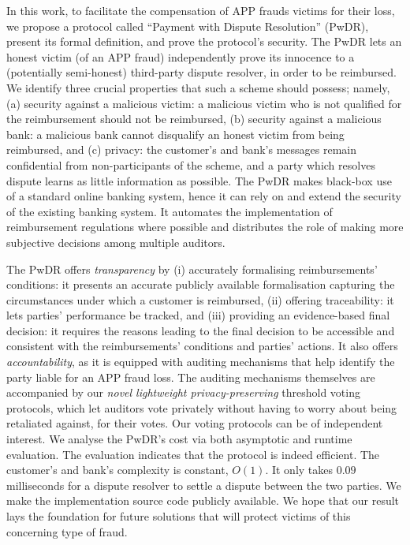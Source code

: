  In this work, to facilitate the compensation of   APP frauds victims for their loss, we propose a protocol called ``Payment with Dispute Resolution'' (PwDR), present its formal definition,  and prove the protocol's security.  The PwDR lets an honest victim (of an APP fraud)  independently prove its innocence to a  (potentially semi-honest) third-party dispute resolver, in order to be reimbursed.  We identify three crucial properties that such a scheme should possess; namely, (a) security against a malicious victim: a malicious victim who is not qualified for the reimbursement should not be reimbursed, (b) security against a malicious bank: a malicious bank cannot disqualify an honest victim from being reimbursed, and (c) privacy: the customer’s and bank’s messages remain confidential from non-participants of the scheme, and a party which resolves dispute learns as little information as possible.  The PwDR makes black-box use of a standard online banking system, hence it can rely on and extend the security of the existing banking system. %
%
   It automates the implementation of reimbursement regulations where possible and distributes the role of making more subjective decisions among multiple auditors.


  The PwDR offers \emph{transparency} by (i) accurately formalising reimbursements' conditions: it presents an accurate publicly available formalisation capturing the circumstances under which a customer is reimbursed,  (ii) offering traceability:  it lets parties'  performance be tracked, and (iii) providing an evidence-based final decision: it requires the reasons leading to the final decision to be accessible and consistent with the reimbursements' conditions and parties' actions.  It also offers \emph{accountability}, as it is equipped with auditing mechanisms that help identify the party liable for an APP fraud loss.  The auditing mechanisms themselves are accompanied by our \emph{novel lightweight privacy-preserving} threshold voting protocols, which let auditors vote privately without having to worry about being retaliated against,  for their votes. Our voting protocols can be of independent interest.   We analyse the PwDR's cost via both asymptotic and runtime evaluation. The evaluation indicates that the protocol is indeed efficient. The customer's and bank's complexity is constant, $O(1)$. It only takes $0.09$ milliseconds for a dispute resolver to settle a dispute between the two parties. We make the implementation source code publicly available. We hope that our result lays the foundation for future solutions that will protect victims of this concerning type of fraud. 

